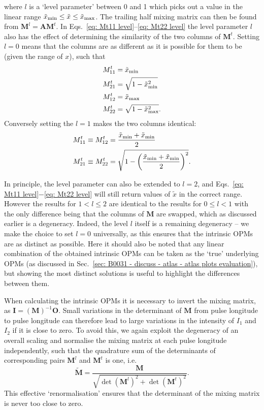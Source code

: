 where $l$ is a `level parameter' between 0 and 1 which picks out a value in the linear range $\Tilde{x}_\mathrm{min} \leq \tilde{x} \leq \Tilde{x}_\mathrm{max}$. The trailing half mixing matrix can then be found from $\mathbf{M}^l=\mathbf{AM}^t$. In Eqs.~\eqref{eq: Mt11 level}--\eqref{eq: Mt22 level} the level parameter $l$ also has the effect of determining the similarity of the two columns of $\mathbf{M}^t$. Setting $l = 0$ means that the columns are as different as it is possible for them to be (given the range of $x$), such that 
\begin{align}
    M_{11}^t &= \Tilde{x}_\mathrm{min}\label{eq: Mt11 level l0}\\
    M_{21}^t &= \sqrt{1-\Tilde{x}_\mathrm{min}^2}\label{eq: Mt12 level l0}\\
    M_{12}^t &= \Tilde{x}_\mathrm{max}\label{eq: Mt21 level l0}\\
    M_{22}^t &= \sqrt{1-\Tilde{x}_\mathrm{max}^2}\label{eq: Mt22 level l0}.
\end{align}
Conversely setting the $l = 1$ makes the two columns identical:  
\begin{align}
    M_{11}^t &\equiv M_{12}^t = \frac{\Tilde{x}_\mathrm{min} + \Tilde{x}_\mathrm{min}}{2}       \label{eq: Mt11 level l1}\\
    M_{21}^t &\equiv M_{22}^t = \sqrt{1-\bigg(\frac{\Tilde{x}_\mathrm{min} + \Tilde{x}_\mathrm{min}}{2}\bigg)^2}.       \label{eq: Mt12 level l1}
\end{align}

In principle, the level parameter can also be extended to $l=2$, and Eqs.~\eqref{eq: Mt11 level}$-$\eqref{eq: Mt22 level} will still return values of $\tilde{x}$ in the correct range. However the results for $1 < l \leq 2$ are identical to the results for $0 \leq l < 1$ with the only difference being that the columns of $\mathbf{M}$ are swapped, which as discussed earlier is a degeneracy. Indeed, the level $l$ itself is a remaining degeneracy -- we make the choice to set $l=0$ universally, as this ensures that the intrinsic OPMs are as distinct as possible. Here it should also be noted that any linear combination of the obtained intrinsic OPMs can be taken as the `true' underlying OPMs (as discussed in Sec.~\ref{sec: B0031 - discuss - atlas - atlas plots evaluation}), but showing the most distinct solutions is useful to highlight the differences between them.

When calculating the intrinsic OPMs it is necessary to invert the mixing matrix, as $\mathbf{I}=(\mathbf{M})^{-1}\mathbf{O}$. Small variations in the determinant of $\mathbf{M}$ from pulse longitude to pulse longitude can therefore lead to large variations in the intensity of $I_1$ and $I_2$ if it is close to zero. To avoid this, we again exploit the degeneracy of an overall scaling and normalise the mixing matrix at each pulse longitude independently, such that the quadrature sum of the determinants of corresponding pairs $\mathbf{M}^l$ and $\mathbf{M}^t$  is one, i.e.
\begin{equation}
    \widetilde{\mathbf{M}} = \frac{\mathbf{M}}{\sqrt{\det(\mathbf{M}^l)^2 + \det(\mathbf{M}^t)^2}}.
\end{equation}
This effective `renormalisation' ensures that the determinant of the mixing matrix is never too close to zero.